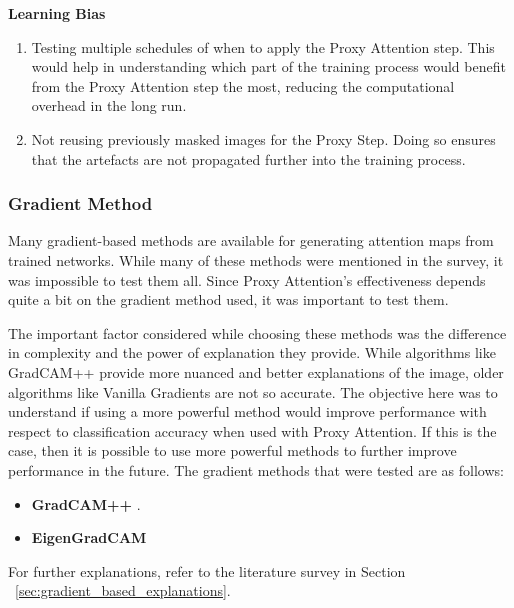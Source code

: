 \textbf{Learning Bias}
\begin{enumerate}
    \item Testing multiple schedules of when to apply the Proxy Attention step. This would help in understanding which part of the training process would benefit from the Proxy Attention step the most, reducing the computational overhead in the long run.
    \item Not reusing previously masked images for the Proxy Step. Doing so ensures that the artefacts are not propagated further into the training process.
\end{enumerate}


\subsubsection{Gradient Method}
Many gradient-based methods are available for generating attention maps from trained networks. While many of these methods were mentioned in the survey, it was impossible to test them all. Since Proxy Attention's effectiveness depends quite a bit on the gradient method used, it was important to test them.

The important factor considered while choosing these methods was the difference in complexity and the power of explanation they provide. While algorithms like GradCAM++ \cite{chattopadhayGradCAMGeneralizedGradientBased2018} provide more nuanced and better explanations of the image, older algorithms like Vanilla Gradients \cite{zeilerVisualizingUnderstandingConvolutional2013} are not so accurate. The objective here was to understand if using a more powerful method would improve performance with respect to classification accuracy when used with Proxy Attention. If this is the case, then it is possible to use more powerful methods to further improve performance in the future.
The gradient methods that were tested are as follows:
\begin{itemize}
    \item \textbf{GradCAM++} \cite{chattopadhayGradCAMGeneralizedGradientBased2018}.
    \item \textbf{EigenGradCAM} \cite{banymuhammadEigenCAMVisualExplanations2021}
\end{itemize}
For further explanations, refer to the literature survey in Section ~\ref{sec:gradient_based_explanations}.

